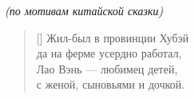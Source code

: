 \documentclass[a5paper,11pt]{memoir}
\begin{document}
\BgThispage
\hfill
\newpage

\PlainPoemTitle
{}
\vspace{-4mm}
\begin{center}\small{\textit{(по мотивам китайской сказки)}}\end{center}

\begin{verse}[\versewidth]
Жил-был в провинции Хубэй \\
да на ферме усердно работал, \\
Лао Вэнь ---  любимец детей, \\
с женой, сыновьями и дочкой. \\
\end{verse}
\end{document}
